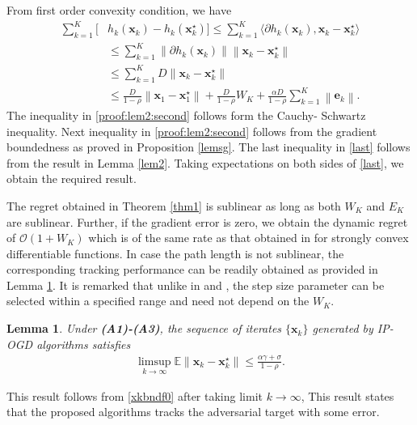 \documentclass[draftcls,onecolumn,12pt]{IEEEtran}
\theoremstyle{plain}
\newtheorem{lem}{Lemma}
\def\x{\mathbf{x}}
\def\e{\mathbf{e}}
\def\xks{\x_k^\star}
\def\EE{\mathbb{E}}
\providecommand{\norm}[1]{\left\|#1\right\|}
\providecommand{\ip}[1]{\langle#1\rangle}
\theoremstyle{plain}
\theoremstyle{remark}
\begin{document}
 \begin{IEEEproof}
From first order convexity condition, we have 
	\begin{align}
 	\sum\limits_{k=1}^{K}[&h_k(\x_k)-h_k(\xks)]\leq  \sum\limits_{k=1}^{K}\ip{\partial h_k(\x_k), \x_k-\xks}\label{proof:lem2:first}
	  		 	\\
	  		 	&\leq \sum\limits_{k=1}^{K}\norm{\partial h_k(\x_{k})}  \norm{\x_k- \xks}\label{proof:lem2:second}
	  		 	\\
	  			&\leq \sum\limits_{k=1}^{K}D \norm{\x_k- \xks}\label{proof:lem2:third}
	  		 		\\
	  		 	&\leq  \frac{D}{1\!-\!\rho}\!\norm{\x_{1} \!-\! \x_{1}^\star} \!+\! \frac{D}{1-\rho}W_{K} + \frac{\alpha D}{1-\rho}\sum_{k=1}^{K} \norm{\e_k}.\label{last} 		 	
	  		 	\end{align}
The inequality in \eqref{proof:lem2:second} follows form the Cauchy- Schwartz inequality. Next inequality in \eqref{proof:lem2:second} follows from the gradient boundedness as proved in Proposition \ref{lemsg}. The last inequality in \eqref{last} follows from the result in Lemma \ref{lem2}. Taking expectations on both sides of \eqref{last}, we obtain the required result. \end{IEEEproof}

The regret obtained in Theorem \ref{thm1} is sublinear as long as both $W_K$ and $E_K$ are sublinear. Further, if the gradient error is zero, we obtain the dynamic regret of $\mathcal{O}(1+W_K)$ which is of the same rate as that obtained in \cite{mokhtari2016online} for strongly convex differentiable functions. In case the path length is not sublinear, the corresponding tracking performance can be readily obtained {as provided in Lemma \ref{tracking_performance}}. It is remarked that unlike in  \cite{shahrampour2018distributed} and \cite{pmlr-v38-jadbabaie15}, the step size parameter can be selected within a specified range and need not depend on the  $W_K$. 

\begin{lem}\label{tracking_performance}
	Under \textbf{(A1)-(A3)}, the sequence of iterates $\{\x_k\}$ generated by IP-OGD algorithms satisfies 
	\begin{align}
	\limsup_{k\rightarrow\infty} 	\EE\norm{\x_k - \xks} \leq   \frac{\alpha \gamma + \sigma}{1-\rho}. \label{xkbndf1}
	\end{align}
\end{lem} 
This result follows from \eqref{xkbndf0} after taking limit $k\rightarrow\infty$, This result states that the proposed algorithms tracks the adversarial target with some error. 
\end{document}
